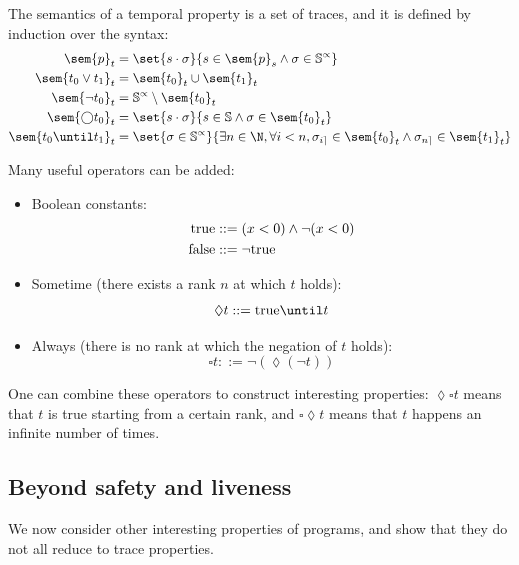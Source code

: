 \documentclass[toc]{../cs-classes/cs-classes}
\begin{document}
The semantics of a temporal property is a set of traces, and it is defined by induction over the syntax:
\begin{equation*}
    \begin{aligned}
        \sem{p}_t &= \set{s\cdot\sigma}{s\in\sem{p}_s\land\sigma\in\S^\propto}\\
        \sem{t_0\lor t_1}_t &= \sem{t_0}_t\cup\sem{t_1}_t\\
        \sem{\lnot t_0}_t &= \S^\propto \setminus \sem{t_0}_t\\
        \sem{\bigcirc t_0}_t &= \set{s\cdot\sigma}{s\in\S\land\sigma\in\sem{t_0}_t}\\
        \sem{t_0\until t_1}_t &= \set{\sigma\in\S^\propto}{\exists n\in\N, \forall i<n, \sigma_{i\rceil}\in\sem{t_0}_t \land \sigma_{n\rceil}\in\sem{t_1}_t}
    \end{aligned}
\end{equation*}

Many useful operators can be added:
\begin{itemize}
    \item Boolean constants:
    \begin{equation*}
        \begin{aligned}
            \textnormal{true} &::= (x<0) \land \lnot(x<0)\\
            \textnormal{false} &::= \lnot \textnormal{true}
        \end{aligned}
    \end{equation*}
    \item Sometime (there exists a rank $n$ at which $t$ holds):
    \begin{equation*}
        \lozenge t ::= \textnormal{true} \until t
    \end{equation*}
    \item Always (there is no rank at which the negation of $t$ holds):
    \begin{equation*}
        \square t ::= \lnot(\lozenge(\lnot t))
    \end{equation*}
\end{itemize}
One can combine these operators to construct interesting properties: $\lozenge\square t$ means that $t$ is true starting from a certain rank, and $\square\lozenge t$ means that $t$ happens an infinite number of times.

\subsection{Beyond safety and liveness}
We now consider other interesting properties of programs, and show that they do not all reduce to trace properties.
\end{document}
